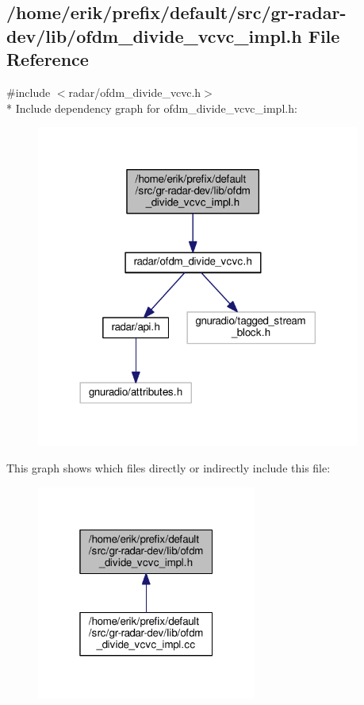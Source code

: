 \subsection{/home/erik/prefix/default/src/gr-\/radar-\/dev/lib/ofdm\+\_\+divide\+\_\+vcvc\+\_\+impl.h File Reference}
\label{ofdm__divide__vcvc__impl_8h}
{\ttfamily \#include $<$radar/ofdm\+\_\+divide\+\_\+vcvc.\+h$>$}\\*
Include dependency graph for ofdm\+\_\+divide\+\_\+vcvc\+\_\+impl.\+h\+:
\nopagebreak
\begin{figure}[H]
\begin{center}
\leavevmode
\includegraphics[width=302pt]{d4/d7d/ofdm__divide__vcvc__impl_8h__incl}
\end{center}
\end{figure}
This graph shows which files directly or indirectly include this file\+:
\nopagebreak
\begin{figure}[H]
\begin{center}
\leavevmode
\includegraphics[width=205pt]{d3/dc7/ofdm__divide__vcvc__impl_8h__dep__incl}
\end{center}
\end{figure}
